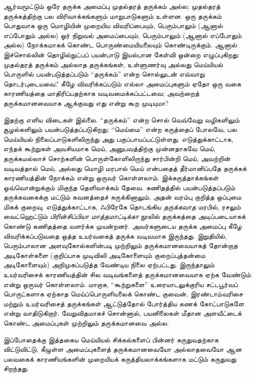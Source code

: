\documentclass[../../../include/open-logic-section]{subfiles}
\begin{document}



ஆர்வமூட்டும் ஒரே தருக்க அமைப்பு முதல்தரத் தருக்கம் அல்ல; முதல்தரத்
தருக்கத்திற்கு பல விரிவாக்கங்களும் மாறுபாடுகளும் உள்ளன. ஒரு தருக்கம்
பொதுவாக ஒரு மொழியின் முறையிய விவரிப்பையும், பெரும்பாலும் (ஆனால்
எப்போதும் அல்ல) ஓர் நிறுவல் அமைப்பையும், பெரும்பாலும் (ஆனால் எப்போதும்
அல்ல) நோக்கமாகக் கொண்ட பொருண்மையியலையும் கொண்டிருக்கும். ஆனால்
இச்சொல்லின் தொழில்நுட்பப் பயன்பாடு இயல்பான கேள்வி ஒன்றை எழுப்புகிறது:
முதல்தரத் தருக்கம் அல்லாத தருக்கங்கள், உள்ளுணர்வு அல்லது மெய்யியல்
பொருளில் பயன்படுத்தப்படும் ``தருக்கம்'' என்ற சொல்லுடன் எவ்வாறு
தொடர்புடையவை? கீழே விவரிக்கப்படும் எல்லா அமைப்புகளும் ஏதோ ஒரு வகை
காரணியத்தை மாதிரிப்பதற்காக வடிவமைக்கப்பட்டவை; அவற்றைத் தருக்கமானவையாக
ஆக்குவது எது என்று கூற முடியுமா?

இதற்கு எளிய விடைகள் இல்லை. ``தருக்கம்'' என்ற சொல் வெவ்வேறு
வழிகளிலும் சூழல்களிலும் பயன்படுத்தப்படுகிறது; ``மெய்மை'' என்ற
கருத்தைப் போலவே, பல மெய்யியல் நிலைப்பாடுகளிலிருந்து அது
பகுப்பாயப்பட்டுள்ளது. எடுத்துக்காட்டாக, எந்தக் கூற்றுகள் அவசியமாக
மெய், அனுபவத்திற்கு முன்னதாகவே மெய், தருக்கமல்லாச் சொற்களின்
பொருள்கோளிலிருந்து சார்பின்றி மெய், அவற்றின் வடிவத்தால் மெய், அல்லது
மொழி மரபால் மெய் என்பதைத் தீர்மானிப்பதே தருக்கக் காரணியத்தின் நோக்கம்
என்று ஒருவர் கொள்ளலாம். இக்கருத்தாக்கங்கள் ஒவ்வொன்றுக்கும் மிகுந்த
தெளிவாக்கம் தேவை. கணிதத்தில் பயன்படுத்தப்படும் தருக்கவகைக்கு மட்டும்
கவனத்தைச் சுருக்கினாலும், அதன் வரம்பு குறித்த ஒப்புமை மிகக் குறைவு.
எடுத்துக்காட்டாக, ஃபிரேகே தொடங்கிய {\em தருக்கவாத} மரபில், ரசலும்
வைட்ஹெட்டும் \textit{பிரின்சிப்பியா மாத்தமாட்டிக்கா} நூலில் தருக்கத்தை
அடிப்படையாகக் கொண்டு கணிதத்தை வளர்க்க முயன்றனர். அவர்களுடைய தருக்க
அமைப்பு கீழே விவரிக்கப்படுவதை ஒத்த உயர்வகைத் தருக்க வடிவமாக இருந்தது.
இறுதியில், பெரும்பாலான அளவுகோல்களின்படி முற்றிலும் தருக்கமானவையாகத்
தோன்றாத அடிகோள்களை (குறிப்பாக முடிவிலி அடிகோளையும் குறைப்புத்தன்மை
அடிகோளையும்) அறிமுகப்படுத்த வேண்டிய நிலை ஏற்பட்டது. இருந்தாலும்
உயர்வரிசைக் காரணியத்தின் சில வடிவங்களைத் தருக்கமானவையாக ஏற்க வேண்டும்
என்று ஒருவர் கொள்ளலாம். மாறாக, ``கூற்றுகளை'' உரையாடலுக்குரிய
சட்டபூர்வப் பொருட்களாக ஏற்காத மெய்ப்பொருளியலைக் கொண்ட குவைன்,
இரண்டாம்வரிசை மற்றும் உயர்வரிசைத் தருக்கங்கள் ஆட்டுத்தோல் போர்த்திய
கணக் கோட்பாடுகளே என்று வாதிடுகிறார். வேறுவிதமாகச் சொன்னால்,
பயனிலைகள் மீதான அளவீட்டைக் கொண்ட அமைப்புகள் முற்றிலும் தருக்கமானவை அல்ல.

இப்போதைக்கு இத்தகைய மெய்யியல் சிக்கல்களைப் பின்னர் கருதுவதற்காக
விட்டுவிட்டு, கீழுள்ள அமைப்புகளைத் தருக்கமானவையோ அல்லாதவையோ ஆன பலவகைக்
காரணியங்களின் முறையியக் கருத்தியலாக்கங்களாக மட்டும் கருதுவது சிறந்தது.
\end{document}
